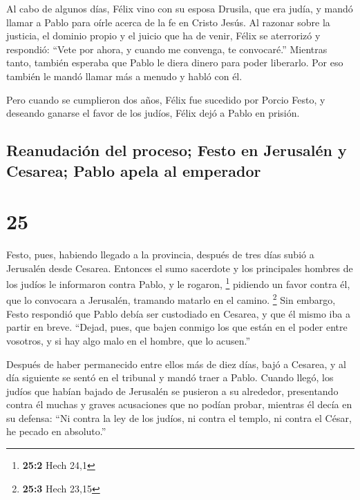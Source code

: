  Al cabo de algunos días, Félix vino con su esposa
Drusila, que era judía, y mandó llamar a Pablo para oírle acerca de la
fe en Cristo Jesús.  Al razonar sobre la justicia, el
dominio propio y el juicio que ha de venir, Félix se aterrorizó y
respondió: ``Vete por ahora, y cuando me convenga, te convocaré.''
 Mientras tanto, también esperaba que Pablo le diera
dinero para poder liberarlo. Por eso también le mandó llamar más a
menudo y habló con él.

 Pero cuando se cumplieron dos años, Félix fue sucedido
por Porcio Festo, y deseando ganarse el favor de los judíos, Félix dejó
a Pablo en prisión.

\hypertarget{reanudaciuxf3n-del-proceso-festo-en-jerusaluxe9n-y-cesarea-pablo-apela-al-emperador}{%
\subsection{Reanudación del proceso; Festo en Jerusalén y Cesarea; Pablo
apela al
emperador}\label{reanudaciuxf3n-del-proceso-festo-en-jerusaluxe9n-y-cesarea-pablo-apela-al-emperador}}

\hypertarget{section-24}{%
\section{25}\label{section-24}}

 Festo, pues, habiendo llegado a la provincia, después de
tres días subió a Jerusalén desde Cesarea.  Entonces el
sumo sacerdote y los principales hombres de los judíos le informaron
contra Pablo, y le rogaron, \footnote{\textbf{25:2} Hech 24,1}
 pidiendo un favor contra él, que lo convocara a
Jerusalén, tramando matarlo en el camino. \footnote{\textbf{25:3} Hech
  23,15}  Sin embargo, Festo respondió que Pablo debía ser
custodiado en Cesarea, y que él mismo iba a partir en breve.
 ``Dejad, pues, que bajen conmigo los que están en el
poder entre vosotros, y si hay algo malo en el hombre, que lo acusen.''

 Después de haber permanecido entre ellos más de diez
días, bajó a Cesarea, y al día siguiente se sentó en el tribunal y mandó
traer a Pablo.  Cuando llegó, los judíos que habían bajado
de Jerusalén se pusieron a su alrededor, presentando contra él muchas y
graves acusaciones que no podían probar,  mientras él
decía en su defensa: ``Ni contra la ley de los judíos, ni contra el
templo, ni contra el César, he pecado en absoluto.''

